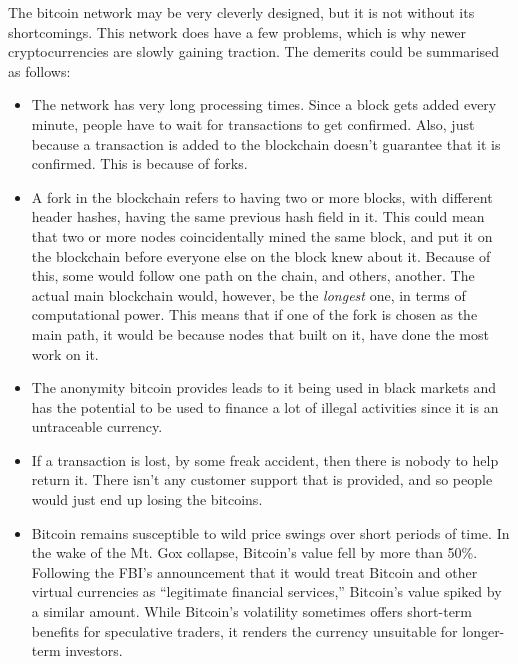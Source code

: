 \documentclass[12pt,a4paper]{report}
\begin{document}
\begin{flushleft}
The bitcoin network may be very cleverly designed, but it is not without its shortcomings. This network does have a few problems, which is why newer cryptocurrencies are slowly gaining traction. The demerits could be summarised as follows: 
\begin{itemize}
    \item The network has very long processing times. Since a block gets added every minute, people have to wait for transactions to get confirmed. Also, just because a transaction is added to the blockchain doesn't guarantee that it is confirmed. This is because of forks.
    \item A fork in the blockchain refers to having two or more blocks, with different header hashes, having the same previous hash field in it. This could mean that two or more nodes coincidentally mined the same block, and put it on the blockchain before everyone else on the block knew about it.\newline
    Because of this, some would follow one path on the chain, and others, another. The actual main blockchain would, however, be the \textit{longest} one, in terms of computational power. This means that if one of the fork is chosen as the main path, it would be because nodes that built on it, have done the most work on it.
    \item The anonymity bitcoin provides leads to it being used in black markets and has the potential to be used to finance a lot of illegal activities since it is an untraceable currency.
    \item If a transaction is lost, by some freak accident, then there is nobody to help return it. There isn't any customer support that is provided, and so people would just end up losing the bitcoins.
    \item Bitcoin remains susceptible to wild price swings over short periods of time. In the wake of the Mt. Gox collapse, Bitcoin’s value fell by more than 50\%. Following the FBI’s announcement that it would treat Bitcoin and other virtual currencies as “legitimate financial services,” Bitcoin’s value spiked by a similar amount. While Bitcoin’s volatility sometimes offers short-term benefits for speculative traders, it renders the currency unsuitable for longer-term investors.
\end{itemize}




\end{flushleft}
\end{document}
